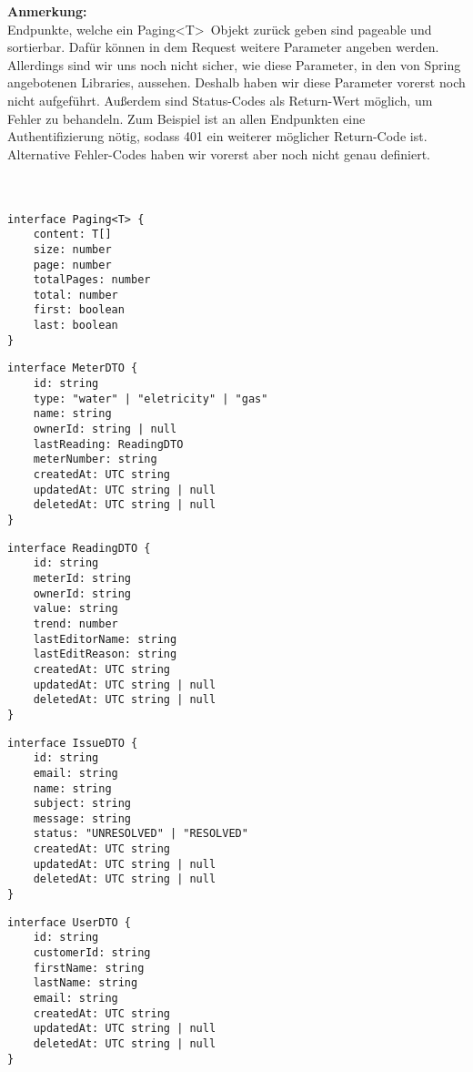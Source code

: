 \textbf{Anmerkung:} \\
Endpunkte, welche ein Paging\textless T\textgreater \ Objekt zurück geben sind pageable und sortierbar. Dafür können in dem Request weitere Parameter angeben werden. Allerdings sind wir uns noch nicht sicher, wie diese Parameter, in den von Spring angebotenen Libraries, aussehen. Deshalb haben wir diese Parameter vorerst noch nicht aufgeführt. Außerdem sind Status-Codes als Return-Wert möglich, um Fehler zu behandeln. Zum Beispiel ist an allen Endpunkten eine Authentifizierung nötig, sodass 401 ein weiterer möglicher Return-Code ist. Alternative Fehler-Codes haben wir vorerst aber noch nicht genau definiert.  \\ \\ \\
 

\begin{lstlisting}
interface Paging<T> {
	content: T[]
	size: number
	page: number
	totalPages: number
	total: number
	first: boolean
	last: boolean
}
\end{lstlisting}


\begin{lstlisting}
interface MeterDTO {
	id: string
	type: "water" | "eletricity" | "gas"
	name: string
	ownerId: string | null
	lastReading: ReadingDTO
	meterNumber: string
	createdAt: UTC string
	updatedAt: UTC string | null
	deletedAt: UTC string | null
}
\end{lstlisting} \newpage

\begin{lstlisting}
interface ReadingDTO {
	id: string
	meterId: string
	ownerId: string
	value: string
	trend: number
	lastEditorName: string
	lastEditReason: string
	createdAt: UTC string
	updatedAt: UTC string | null
	deletedAt: UTC string | null
}
\end{lstlisting}

\begin{lstlisting}
interface IssueDTO {
	id: string
	email: string
	name: string
	subject: string
	message: string
	status: "UNRESOLVED" | "RESOLVED"
	createdAt: UTC string
	updatedAt: UTC string | null
	deletedAt: UTC string | null
}
\end{lstlisting}


\begin{lstlisting}
interface UserDTO {
	id: string
	customerId: string
	firstName: string
	lastName: string
	email: string
	createdAt: UTC string
	updatedAt: UTC string | null
	deletedAt: UTC string | null
}
\end{lstlisting}

